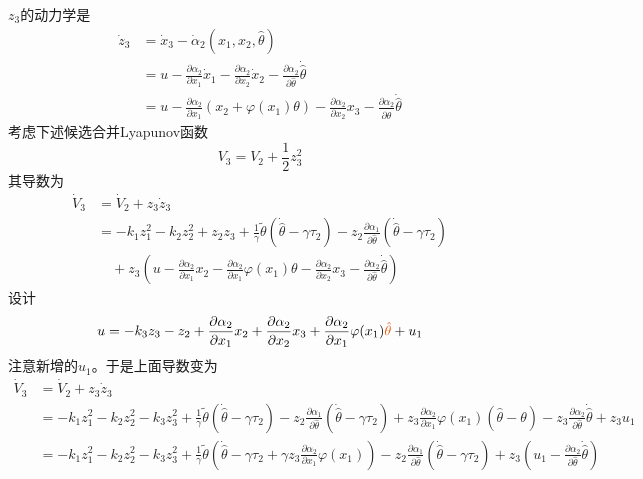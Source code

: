 
$z_3$的动力学是
\begin{align*}
    \dot{z}_3&=\dot{x}_3-\dot{\alpha}_2(x_1,x_2,\hat{\theta})\\
    &=u-\frac{\partial\alpha_2}{\partial x_1}\dot{x}_1-\frac{\partial\alpha_2}{\partial x_2}\dot{x}_2 - \frac{\partial\alpha_2}{\partial \hat{\theta}}\dot{\hat{\theta}}\\
    &=u-\frac{\partial\alpha_2}{\partial x_1}(x_2+\varphi(x_1)\theta)-\frac{\partial\alpha_2}{\partial x_2}x_3 - \frac{\partial\alpha_2}{\partial \hat{\theta}}\dot{\hat{\theta}}
\end{align*}
考虑下述候选合并Lyapunov函数
\[ V_3 = V_2 + \frac{1}{2} z^2_3 \]
其导数为
\begin{align*}
    \dot{V}_3&=\dot{V}_2+z_3\dot{z}_3\\
    &=-k_1z_1^2-k_2z_2^2+z_2z_3+\frac{1}{\gamma}\tilde{\theta}(\dot{\hat{\theta}}-\gamma \tau_2)-z_2\frac{\partial
  \alpha_1}{\partial \hat{\theta} }(\dot{\hat{\theta}}-\gamma\tau_2)\\
  &\quad +z_3\left(u-\frac{\partial\alpha_2}{\partial x_1}x_2-\frac{\partial\alpha_2}{\partial x_1}\varphi(x_1)\theta-\frac{\partial\alpha_2}{\partial x_2}x_3 - \frac{\partial\alpha_2}{\partial \hat{\theta}}\dot{\hat{\theta}}\right)
\end{align*}
设计
\[u=-k_3z_3-z_2+\frac{\partial\alpha_2}{\partial x_1}x_2+\frac{\partial\alpha_2}{\partial x_2}x_3+\frac{\partial\alpha_2}{\partial x_1}\varphi(x_1)\textcolor{second}{\hat\theta}+u_1\]
注意新增的$u_1$。于是上面导数变为
\begin{align*}
    \dot{V}_3&=\dot{V}_2+z_3\dot{z}_3\\
    &=-k_1z_1^2-k_2z_2^2-k_3z_3^2+\frac{1}{\gamma}\tilde{\theta}(\dot{\hat{\theta}}-\gamma \tau_2)-z_2\frac{\partial
  \alpha_1}{\partial \hat{\theta} }(\dot{\hat{\theta}}-\gamma\tau_2) +z_3\frac{\partial\alpha_2}{\partial x_1}\varphi(x_1)(\hat{\theta}-\theta)- z_3\frac{\partial\alpha_2}{\partial \hat{\theta}}\dot{\hat{\theta}}+z_3u_1\\
  &=-k_1z_1^2-k_2z_2^2-k_3z_3^2+\frac{1}{\gamma}\tilde{\theta}\left(\dot{\hat{\theta}}-\gamma \tau_2+\gamma z_3\frac{\partial\alpha_2}{\partial x_1}\varphi(x_1)\right)-z_2\frac{\partial
  \alpha_1}{\partial \hat{\theta} }(\dot{\hat{\theta}}-\gamma\tau_2) +z_3\left(u_1- \frac{\partial\alpha_2}{\partial \hat{\theta}}\dot{\hat{\theta}}\right)
\end{align*}

